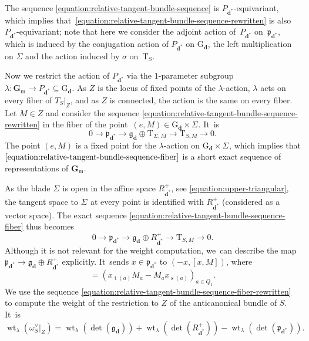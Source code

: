\documentclass[JEP,XML,SOM,Unicode,NoEqCountersInSection,published]{cedram}
\theoremstyle{plain}
\theoremstyle{definition}
\DeclareMathOperator\source{s}
\DeclareMathOperator\target{t}
\DeclareMathOperator\weight{wt}
\newcommand\blade[1][]{\Sigma_{#1}}
\newcommand\Gm{\ensuremath{\mathbf{G}_{\mathrm{m}}}}
\newcommand\group[1][\tuple{d}]{\mathrm{G}_{#1}}
\newcommand\tangent{\ensuremath{\mathrm{T}}}
\newcommand\tuple[1]{\ensuremath{{\boldsymbol{#1}}}}
\begin{document}
The sequence \eqref{equation:relative-tangent-bundle-sequence}
is $P_{\tuple{d}^*}$-equivariant, which implies that~\eqref{equation:relative-tangent-bundle-sequence-rewritten} is also $P_{\tuple{d}^*}$\nobreakdash-equi\-variant;
note that here we consider the adjoint action of~$P_{\tuple{d}^*}$ on~$\mathfrak{p}_{\tuple{d}^*}$, which is induced by the conjugation action of $P_{\tuple{d}^*}$ on $\group$, the left multiplication on $\Sigma$ and the action induced by $\sigma$ on~$\tangent_{S}$.

Now we restrict the action of $P_{\tuple{d}^*}$ via the $1$-parameter subgroup $\lambda\colon \Gm\!\to\! P_{\tuple{d}^*} \!\subseteq\! \group$.
As $Z$ is the locus of fixed points of the $\lambda$-action,
$\lambda$ acts on every fiber of $T_S|_Z$,
and as $Z$ is connected, the action is the same on every fiber.
Let $M \in Z$ and consider the sequence \eqref{equation:relative-tangent-bundle-sequence-rewritten}
in the fiber of the point~$(e,M) \in \group \times \blade$. It~is
\begin{equation}
\label{equation:relative-tangent-bundle-sequence-fiber}
0
\to\mathfrak{p}_{\tuple{d}^*}
\to\mathfrak{g}_{\tuple{d}} \oplus \tangent_{\blade,M}
\to\tangent_{S,M}
\to0.
\end{equation}
The point $(e,M)$ is a fixed point for the $\lambda$-action on $\group \times \blade$,
which implies that $\eqref{equation:relative-tangent-bundle-sequence-fiber}$ is a short exact sequence of representations of $\Gm$.

As the blade $\blade$ is open in the affine space $R_{\tuple{d}^*}^+$, see \eqref{equation:upper-triangular},
the tangent space to $\blade$ at every point is identified
with $R_{\tuple{d}^*}^+$ (considered as a vector space).
The exact sequence \eqref{equation:relative-tangent-bundle-sequence-fiber} thus becomes
\begin{equation}
\label{equation:relative-tangent-bundle-sequence-fiber-rewritten}
0
\to\mathfrak{p}_{\tuple{d}^*}
\to\mathfrak{g}_{\tuple{d}} \oplus R_{\tuple{d}^*}^+
\to\tangent_{S,M}
\to0.
\end{equation}
Although it is not relevant for the weight computation, we~can describe the map $\mathfrak{p}_{\tuple{d}^*} \to \mathfrak{g}_{\tuple{d}} \oplus R_{\tuple{d}^*}^+$ explicitly. It~sends $x \in \mathfrak{p}_{\tuple{d}^*}$ to $(-x, [x,M])$, where
\begin{equation*}
[x,M] = (x_{\target(a)}M_a - M_ax_{\source(a)})_{a \in Q_1}.
\end{equation*}
We use the sequence \eqref{equation:relative-tangent-bundle-sequence-fiber-rewritten}
to compute the weight of the restriction to $Z$ of the anticanonical bundle of $S$. It~is
\begin{equation}
\label{equation:split-computation}
\weight_{\lambda}(\omega_S^\vee|_Z) = \weight_{\lambda}(\det(\mathfrak{g}_{\tuple{d}})) + \weight_{\lambda}(\det(R_{\tuple{d}^*}^+)) - \weight_{\lambda}(\det(\mathfrak{p}_{\tuple{d}^*})).
\end{equation}
\end{document}
